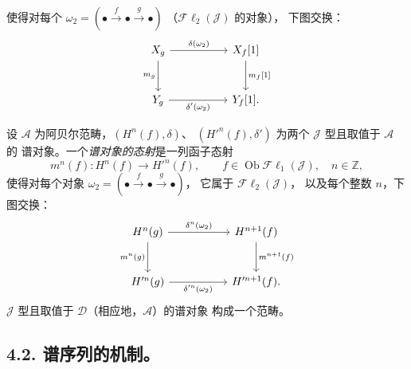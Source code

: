 \clearpage
{}%
\begingroup\small\setlength{\parskip}{0pt}\setlength{\emergencystretch}{1.5em}
使得对每个 $\omega_2=(\mathord\bullet\xrightarrow f\mathord\bullet\xrightarrow g\mathord\bullet)$
（$\mathcal{F}\ell_2(\mathcal J)$ 的对象），
下图交换：
\[
\begin{tikzcd}[column sep=5.2em,row sep=2.7em]
X_g\arrow[r,"{\delta(\omega_2)}"]\arrow[d,"{m_g}"']&X_f[1]\arrow[d,"{m_f[1]}"]\\
Y_g\arrow[r,"{\delta'(\omega_2)}"']&Y_f[1].
\end{tikzcd}
\]

设 $\mathcal A$ 为阿贝尔范畴，$(H^n(f),\delta)$、
$(H'^{n}(f),\delta')$ 为两个 $\mathcal J$ 型且取值于 $\mathcal A$ 的
谱对象。一个\emph{谱对象的态射}是一列函子态射
\[
m^n(f)\colon H^n(f)\longrightarrow H'^{n}(f),\qquad
f\in\operatorname{Ob}\mathcal{F}\ell_1(\mathcal J),\quad n\in\mathbb Z,
\]
使得对每个对象
$\omega_2=(\mathord\bullet\xrightarrow f\mathord\bullet\xrightarrow g\mathord\bullet)$，
它属于 $\mathcal{F}\ell_2(\mathcal J)$，
以及每个整数 $n$，下图交换：
\[
\begin{tikzcd}[column sep=5.2em,row sep=2.7em]
H^n(g)\arrow[r,"{\delta^n(\omega_2)}"]\arrow[d,"{m^n(g)}"']&
H^{n+1}(f)\arrow[d,"{m^{n+1}(f)}"]\\
H'^{n}(g)\arrow[r,"{\delta'^{n}(\omega_2)}"']&H'^{n+1}(f).
\end{tikzcd}
\]
$\mathcal J$ 型且取值于 $\mathcal D$（相应地，$\mathcal A$）的谱对象
构成一个范畴。

\subsection*{4.2. 谱序列的机制。}

